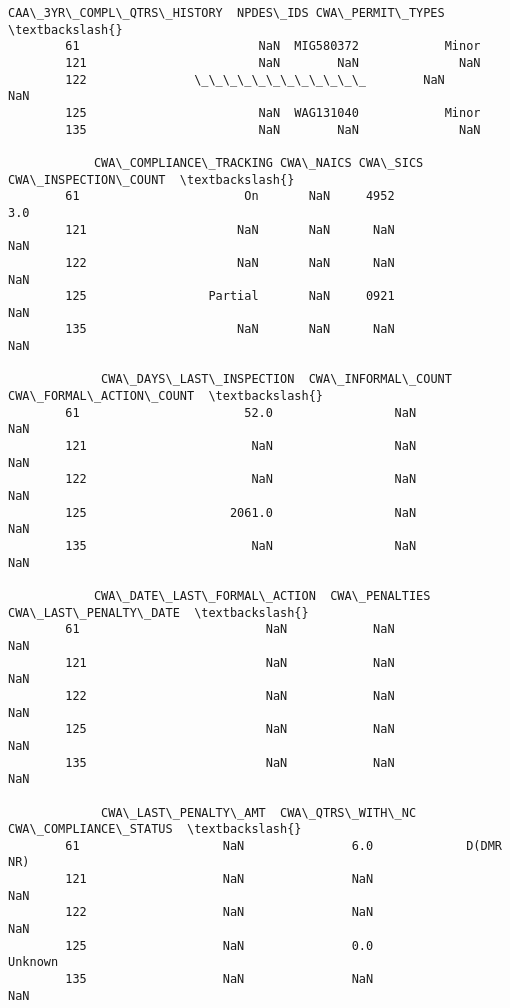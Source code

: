 \documentclass[11pt]{article}
\begin{document}
\begin{Verbatim}[commandchars=\\\{\}]
            CAA\_3YR\_COMPL\_QTRS\_HISTORY  NPDES\_IDS CWA\_PERMIT\_TYPES  \textbackslash{}
        61                         NaN  MIG580372            Minor   
        121                        NaN        NaN              NaN   
        122               \_\_\_\_\_\_\_\_\_\_\_\_        NaN              NaN   
        125                        NaN  WAG131040            Minor   
        135                        NaN        NaN              NaN   
        
            CWA\_COMPLIANCE\_TRACKING CWA\_NAICS CWA\_SICS  CWA\_INSPECTION\_COUNT  \textbackslash{}
        61                       On       NaN     4952                   3.0   
        121                     NaN       NaN      NaN                   NaN   
        122                     NaN       NaN      NaN                   NaN   
        125                 Partial       NaN     0921                   NaN   
        135                     NaN       NaN      NaN                   NaN   
        
             CWA\_DAYS\_LAST\_INSPECTION  CWA\_INFORMAL\_COUNT  CWA\_FORMAL\_ACTION\_COUNT  \textbackslash{}
        61                       52.0                 NaN                      NaN   
        121                       NaN                 NaN                      NaN   
        122                       NaN                 NaN                      NaN   
        125                    2061.0                 NaN                      NaN   
        135                       NaN                 NaN                      NaN   
        
            CWA\_DATE\_LAST\_FORMAL\_ACTION  CWA\_PENALTIES CWA\_LAST\_PENALTY\_DATE  \textbackslash{}
        61                          NaN            NaN                   NaN   
        121                         NaN            NaN                   NaN   
        122                         NaN            NaN                   NaN   
        125                         NaN            NaN                   NaN   
        135                         NaN            NaN                   NaN   
        
             CWA\_LAST\_PENALTY\_AMT  CWA\_QTRS\_WITH\_NC CWA\_COMPLIANCE\_STATUS  \textbackslash{}
        61                    NaN               6.0             D(DMR NR)   
        121                   NaN               NaN                   NaN   
        122                   NaN               NaN                   NaN   
        125                   NaN               0.0               Unknown   
        135                   NaN               NaN                   NaN   
        

\end{Verbatim}
\end{document}
